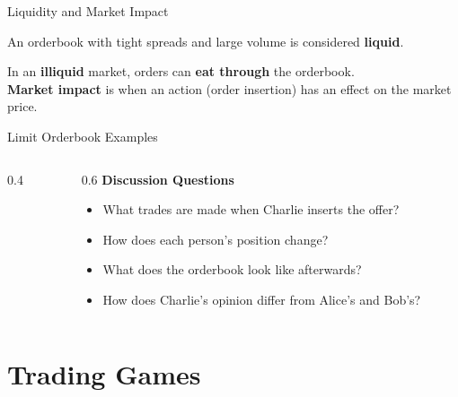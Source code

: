 \begin{frame}{Liquidity and Market Impact}
  \begin{sqt:definition}
    An orderbook with tight spreads and large volume is considered \textbf{liquid}.
  \end{sqt:definition}

  In an \textbf{illiquid} market, orders can \textbf{eat through} the orderbook.\\
  \textbf{Market impact} is when an action (order insertion) has an effect on the market price.

  \begin{center}
    
  \end{center}
\end{frame}

\begin{frame}{Limit Orderbook Examples}
  \begin{columns}[T]
    \begin{column}{0.4\textwidth}
      
    \end{column}

    \begin{column}{0.6\textwidth}
      \textbf{Discussion Questions}
      \begin{itemize}
        \item What trades are made when Charlie inserts the offer?
        \item How does each person's position change?
        \item What does the orderbook look like afterwards?
        \item How does Charlie's opinion differ from Alice's and Bob's?
      \end{itemize}
    \end{column}
  \end{columns}

\end{frame}

\section{Trading Games}

